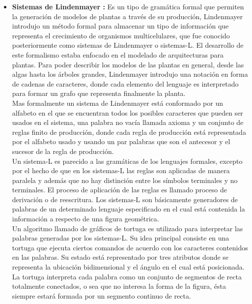 \documentclass[letterpaper, 11pt, oneside]{article}
\theoremstyle{definition}
\theoremstyle{remark}
\begin{document}
\begin{itemize}
\item \textbf{Sistemas de Lindenmayer :}  Es un tipo de gramática formal que permiten la generación de modelos de plantas a través de su producción, Lindenmayer introdujo un método formal para almacenar un tipo de información que representa el crecimiento de organismos multicelulares, que fue conocido posteriormente como sistemas de Lindenmayer o sistemas-L. El desarrollo de este formalismo estaba enfocado en el modelado de arquitecturas para plantas. Para poder describir los modelos de las plantas en general, desde las algas hasta los árboles grandes, Lindenmayer introdujo una notación en forma de cadenas de caracteres, donde cada elemento del lenguaje es interpretado para formar un grafo que representa finalmente la planta. \\

Mas formalmente un sistema de Lindenmayer está conformado por un alfabeto en el que se encuentran todos los posibles caracteres que pueden ser usados en el sistema, una palabra no vacía llamada axioma y un conjunto de reglas finito de producción, donde cada regla de producción está representada por el alfabeto usado y usando un par palabras que son el antecesor y el sucesor de la regla de producción. \\

Un sistema-L es parecido a las gramáticas de los lenguajes formales, excepto por el hecho de que en los sistemas-L las reglas son aplicadas de manera paralela y además  que no hay distinción entre los símbolos terminales y no terminales. El proceso de aplicación de las reglas es llamado proceso de derivación o de reescritura. Los sistemas-L son básicamente generadores de palabras de un determinado lenguaje especificado en el cual está contenida la información a respecto de una figura geométrica. \\

Un algoritmo llamado de gráficos de tortuga es utilizado para interpretar las palabras generadas por los sistemas-L. Su idea principal consiste en una tortuga que ejecuta ciertos comandos de acuerdo con los caracteres contenidos en las palabras. Su estado está representado por tres atributos donde se representa la ubicación bidimensional y el ángulo en el cual está posicionada. La tortuga interpreta cada palabra como un conjunto de segmentos de recta totalmente conectados, o sea que no interesa la forma de la figura, ésta siempre estará formada por un segmento continuo de recta.\\
\end{itemize}
\end{document}
